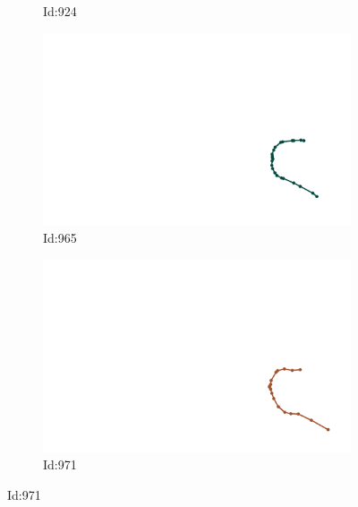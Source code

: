 \documentclass[12pt,twoside]{report}
\begin{document}
\begin{figure}
\begin{subfigure}[b]{0.20\textwidth}
\caption{Id:924}
\end{subfigure}
\begin{subfigure}[b]{0.20\textwidth}
\centering
\includegraphics[width=\textwidth]{../../trajectories/965.png}
\caption{Id:965}
\end{subfigure}
\begin{subfigure}[b]{0.20\textwidth}
\centering
\includegraphics[width=\textwidth]{../../trajectories/971.png}
\caption{Id:971}
\end{subfigure}
\end{figure}
\end{document}
